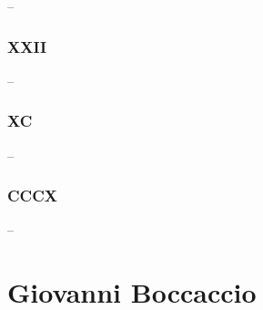 \documentclass{article}
\begin{document}
--

\newpage
\subsubsection{XXII}

--

\newpage
\subsubsection{XC}

--

\newpage
\subsubsection{CCCX}

--

\newpage
\section{Giovanni Boccaccio}
\end{document}
